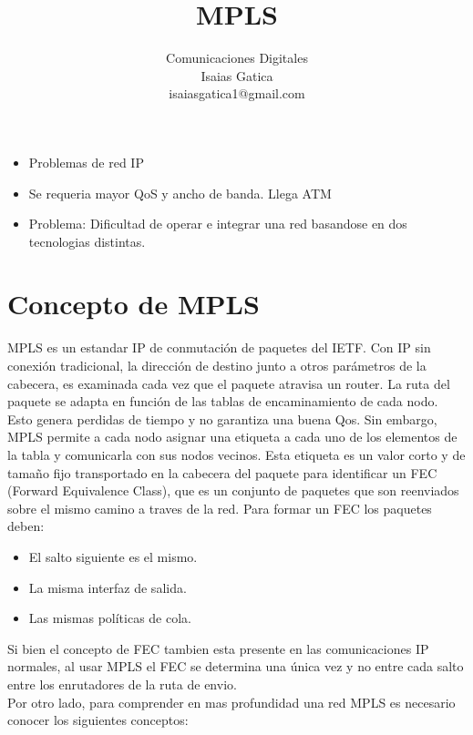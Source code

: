 \documentclass[a4paper]{article}
\title{MPLS}
\author{Comunicaciones Digitales\\
  \small Isaias Gatica\\
  \small isaiasgatica1@gmail.com\\
  \date{}
}
\begin{document}
\maketitle

\begin{itemize}
    \item Problemas de red IP
    \item Se requeria mayor QoS y ancho de banda. Llega ATM
    \item Problema: Dificultad de operar e integrar una red basandose en dos tecnologias distintas.
\end{itemize}
\section{Concepto de MPLS}
MPLS es un estandar IP de conmutación de paquetes del IETF. Con IP sin conexión tradicional, la dirección
de destino junto a otros parámetros de la cabecera, es examinada cada vez que el paquete atravisa un router. La ruta
del paquete se adapta en función de las tablas de encaminamiento de cada nodo. Esto genera perdidas de tiempo y no garantiza una buena Qos.
Sin embargo, MPLS permite a cada nodo asignar una etiqueta a cada uno de los elementos de la tabla y comunicarla 
con sus nodos vecinos. Esta etiqueta es un valor corto y de tamaño fijo transportado en la cabecera del paquete para 
identificar un FEC (Forward Equivalence Class), que es un conjunto de paquetes que son reenviados
sobre el mismo camino a traves de la red. Para formar un FEC los paquetes deben:
\begin{itemize}
    \item El salto siguiente es el mismo.
    \item La misma interfaz de salida.
    \item Las mismas políticas de cola.
\end{itemize}
Si bien el concepto de FEC tambien esta presente en las comunicaciones IP normales, al usar MPLS el FEC se determina una única vez y no entre cada 
salto entre los enrutadores de la ruta de envio. \\
Por otro lado, para comprender en mas profundidad una red MPLS es necesario conocer los siguientes conceptos:
\end{document}
